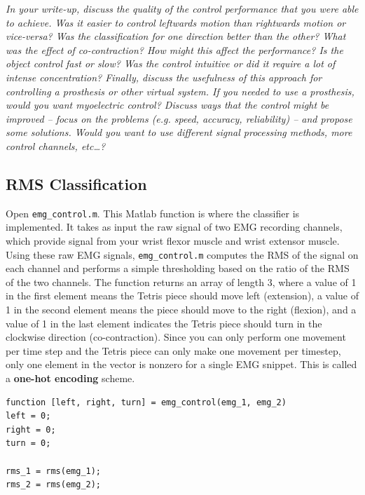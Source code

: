 \documentclass[10pt,oneside,a4paper]{article}
\begin{document}
\textit{In your write-up, discuss the quality of the control performance that you were able to achieve. Was it easier to control leftwards motion than rightwards motion or vice-versa? Was the classification for one direction better than the other? What was the effect of co-contraction? How might this affect the performance? Is the object control fast or slow? Was the control intuitive or did it require a lot of intense concentration? Finally, discuss the usefulness of this approach for controlling a prosthesis or other virtual system. If you needed to use a prosthesis, would you want myoelectric control? Discuss ways that the control might be improved – focus on the problems (e.g. speed, accuracy, reliability) – and propose some solutions. Would you want to use different signal processing methods, more control channels, etc\dots ?}

\subsection{RMS Classification}
Open \texttt{emg\_control.m}. This Matlab function is where the classifier is implemented. It takes as input the raw signal of two EMG recording channels, which provide signal from your wrist flexor muscle and wrist extensor muscle. Using these raw EMG signals, \texttt{emg\_control.m} computes the RMS of the signal on each channel and performs a simple thresholding based on the ratio of the RMS of the two channels. The function returns an array of length 3, where a value of 1 in the first element means the Tetris piece should move left (extension), a value of 1 in the second element means the piece should move to the right (flexion), and a value of 1 in the last element indicates the Tetris piece should turn in the clockwise direction (co-contraction). Since you can only perform one movement per time step and the Tetris piece can only make one movement per timestep, only one element in the vector is nonzero for a single EMG snippet. This is called a \textbf{one-hot encoding} scheme. 
\begin{verbatim}
function [left, right, turn] = emg_control(emg_1, emg_2)
left = 0;
right = 0;
turn = 0;

rms_1 = rms(emg_1);
rms_2 = rms(emg_2);
\end{verbatim}
 
\end{document}

